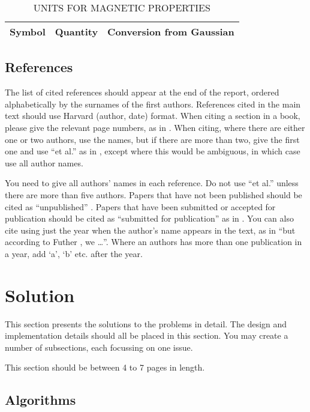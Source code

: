 \documentclass[12pt,a4paper]{article}
\begin{document}
\begin{table}[htb]
\centering
\caption{UNITS FOR MAGNETIC PROPERTIES}
\vspace*{6pt}
\label{units}
\begin{tabular}{ccc}\hline\hline
Symbol & Quantity & Conversion from Gaussian \\ \hline
\end{tabular}
\end{table}

\subsection{References}

The list of cited references should appear at the end of the report, ordered alphabetically by the surnames of the first authors.  References cited in the main text should use Harvard (author, date) format.  When citing a section in a book, please give the relevant page numbers, as in \cite[p293]{budgen}.  When citing, where there are either one or two authors, use the names, but if there are more than two, give the first one and use ``et al.'' as in  , except where this would be ambiguous, in which case use all author names.

You need to give all authors' names in each reference.  Do not use ``et al.'' unless there are more than five authors.  Papers that have not been published should be cited as ``unpublished'' \cite{euther}.  Papers that have been submitted or accepted for publication should be cited as ``submitted for publication'' as in \cite{futher} .  You can also cite using just the year when the author's name appears in the text, as in ``but according to Futher \citeyear{futher}, we \dots''.  Where an authors has more than one publication in a year, add `a', `b' etc. after the year.

\section{Solution}

This section presents the solutions to the problems in detail.  The design and implementation details should all be placed in this section.  You may create a number of subsections, each focussing on one issue.  

This section should be between 4 to 7 pages in length.

\subsection{Algorithms}
\end{document}
